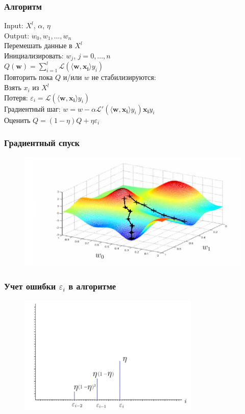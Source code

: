 \documentclass[10pt]{beamer}
\begin{document}
\begin{frame}\frametitle{Алгоритм}
	Input: $X^l$, $\alpha$, $\eta$\\
	Output: $w_0, w_1, \dots, w_n$\\
	\vspace{3mm}
	Перемешать данные в $X^l$\\
	Инициализировать: $w_j$, $j=0,\dots, n$\\
	\hspace{35mm} ${Q}(\mathbf{w}) = \sum\limits_{i=1}^l \mathcal{L}(\langle \mathbf{w}, \mathbf{x_i} \rangle y_i)$\\
	Повторить пока $Q$ и/или $w$ не стабилизируются:\\
	\hspace{5mm} Взять $x_i$ из $X^l$\\
	\hspace{5mm} Потеря: $\varepsilon_i = \mathcal{L}(\langle \mathbf{w}, \mathbf{x_i} \rangle y_i)$\\
	\hspace{5mm} Градиентный шаг: $w =  w - \alpha \mathcal{L}'(\langle \mathbf{w}, \mathbf{x_i}\rangle y_i)\mathbf{x_i}y_i$\\
	\hspace{5mm} Оценить $Q = (1-\eta)Q + \eta \varepsilon_i$
\end{frame}

\begin{frame}\frametitle{Градиентный спуск}
	\begin{figure}[htbp]
	  \includegraphics[height=160pt, keepaspectratio = true]{images/gradient_descent2}
	\end{figure}
\end{frame}

\begin{frame}\frametitle{Учет ошибки $\varepsilon_i$ в алгоритме}
	\begin{figure}[htbp]
	  \includegraphics[height=160pt, keepaspectratio = true]{images/l2}
	\end{figure}
\end{frame}
\end{document}
